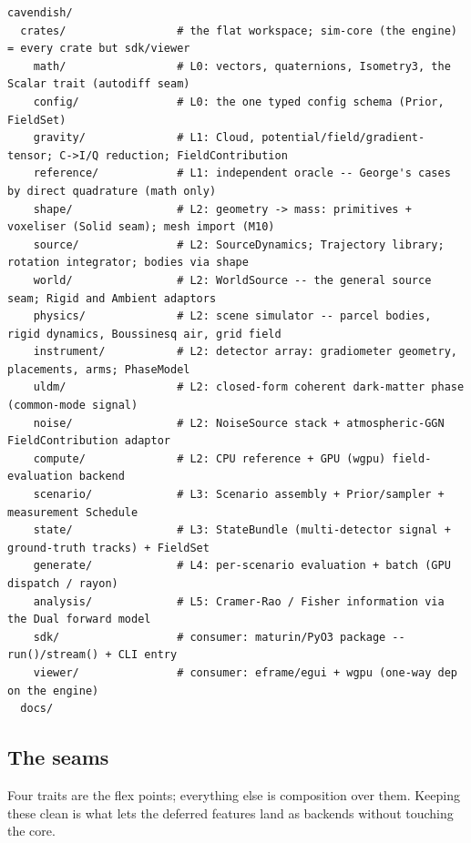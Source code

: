 \documentclass[11pt,a4paper]{article}
\theoremstyle{reqstyle}
\begin{document}
\begin{lstlisting}
cavendish/
  crates/                 # the flat workspace; sim-core (the engine) = every crate but sdk/viewer
    math/                 # L0: vectors, quaternions, Isometry3, the Scalar trait (autodiff seam)
    config/               # L0: the one typed config schema (Prior, FieldSet)
    gravity/              # L1: Cloud, potential/field/gradient-tensor; C->I/Q reduction; FieldContribution
    reference/            # L1: independent oracle -- George's cases by direct quadrature (math only)
    shape/                # L2: geometry -> mass: primitives + voxeliser (Solid seam); mesh import (M10)
    source/               # L2: SourceDynamics; Trajectory library; rotation integrator; bodies via shape
    world/                # L2: WorldSource -- the general source seam; Rigid and Ambient adaptors
    physics/              # L2: scene simulator -- parcel bodies, rigid dynamics, Boussinesq air, grid field
    instrument/           # L2: detector array: gradiometer geometry, placements, arms; PhaseModel
    uldm/                 # L2: closed-form coherent dark-matter phase (common-mode signal)
    noise/                # L2: NoiseSource stack + atmospheric-GGN FieldContribution adaptor
    compute/              # L2: CPU reference + GPU (wgpu) field-evaluation backend
    scenario/             # L3: Scenario assembly + Prior/sampler + measurement Schedule
    state/                # L3: StateBundle (multi-detector signal + ground-truth tracks) + FieldSet
    generate/             # L4: per-scenario evaluation + batch (GPU dispatch / rayon)
    analysis/             # L5: Cramer-Rao / Fisher information via the Dual forward model
    sdk/                  # consumer: maturin/PyO3 package -- run()/stream() + CLI entry
    viewer/               # consumer: eframe/egui + wgpu (one-way dep on the engine)
  docs/
\end{lstlisting}

\subsection{The seams}
Four traits are the flex points; everything else is composition over them. Keeping these
clean is what lets the deferred features land as backends without touching the core.
\end{document}

